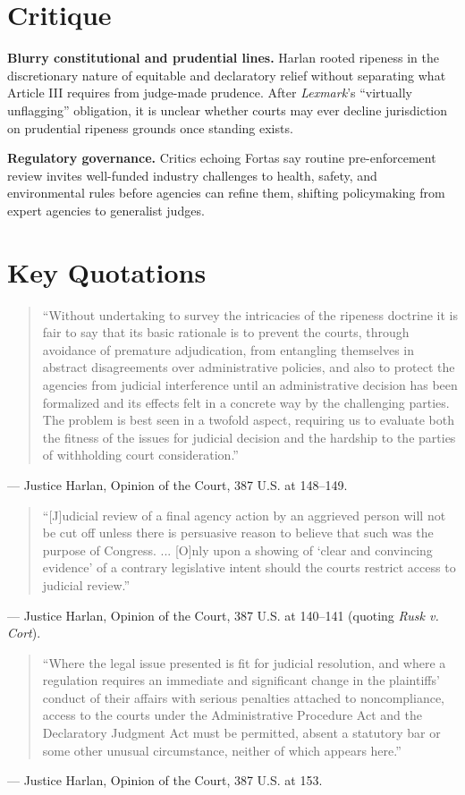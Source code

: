 \documentclass[12pt]{article}
\begin{document}
\section{Critique}

\textbf{Blurry constitutional and prudential lines.} Harlan rooted ripeness in the discretionary nature of equitable and declaratory relief without separating what Article III requires from judge-made prudence. After \textit{Lexmark}'s ``virtually unflagging'' obligation, it is unclear whether courts may ever decline jurisdiction on prudential ripeness grounds once standing exists.

\textbf{Regulatory governance.} Critics echoing Fortas say routine pre-enforcement review invites well-funded industry challenges to health, safety, and environmental rules before agencies can refine them, shifting policymaking from expert agencies to generalist judges.

\section{Key Quotations}

\begin{quote}
``Without undertaking to survey the intricacies of the ripeness doctrine it is fair to say that its basic rationale is to prevent the courts, through avoidance of premature adjudication, from entangling themselves in abstract disagreements over administrative policies, and also to protect the agencies from judicial interference until an administrative decision has been formalized and its effects felt in a concrete way by the challenging parties. The problem is best seen in a twofold aspect, requiring us to evaluate both the fitness of the issues for judicial decision and the hardship to the parties of withholding court consideration.''
\end{quote}
\noindent --- Justice Harlan, Opinion of the Court, 387 U.S. at 148--149.

\begin{quote}
``[J]udicial review of a final agency action by an aggrieved person will not be cut off unless there is persuasive reason to believe that such was the purpose of Congress. ... [O]nly upon a showing of `clear and convincing evidence' of a contrary legislative intent should the courts restrict access to judicial review.''
\end{quote}
\noindent --- Justice Harlan, Opinion of the Court, 387 U.S. at 140--141 (quoting \textit{Rusk v. Cort}).

\begin{quote}
``Where the legal issue presented is fit for judicial resolution, and where a regulation requires an immediate and significant change in the plaintiffs' conduct of their affairs with serious penalties attached to noncompliance, access to the courts under the Administrative Procedure Act and the Declaratory Judgment Act must be permitted, absent a statutory bar or some other unusual circumstance, neither of which appears here.''
\end{quote}
\noindent --- Justice Harlan, Opinion of the Court, 387 U.S. at 153.
\end{document}
